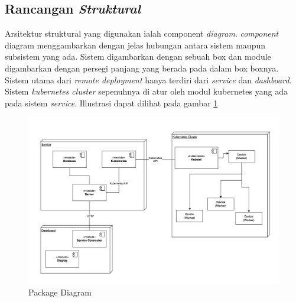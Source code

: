 \subsection{Rancangan \textit{Struktural}}
\label{subsec:arsitektur-struktural}

Arsitektur struktural yang digunakan ialah component \textit{diagram}. \textit{component} diagram menggambarkan dengan jelas hubungan antara sistem maupun subsistem yang ada. Sistem digambarkan dengan sebuah box dan module digambarkan dengan persegi panjang yang berada pada dalam box boxnya. Sistem utama dari \textit{remote deployment} hanya terdiri dari \textit{service} dan \textit{dashboard}. Sistem \textit{kubernetes cluster} sepenuhnya di atur oleh modul kubernetes yang ada pada sistem \textit{service}. Illustrasi dapat dilihat pada gambar \ref{fig:package-diagram}

\begin{figure}[ht]
  \centering
  \includegraphics[width=1\textwidth]{resources/chapter-3/package-diagram.jpg}
  \caption{Package Diagram}
  \label{fig:package-diagram}
\end{figure}

